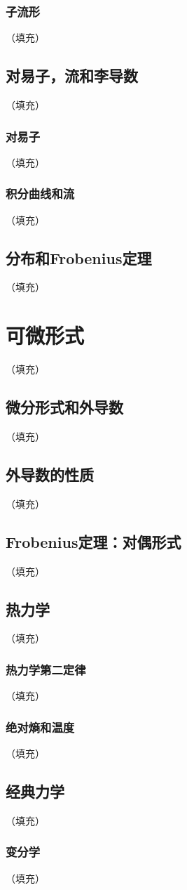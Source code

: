 \documentclass[hyperref,UTF8]{ctexbook}
\begin{document}
\subsection{子流形}（填充）
\section{对易子，流和李导数}（填充）
\subsection{对易子}（填充）
\subsection{积分曲线和流}（填充）
\section{分布和Frobenius定理}（填充）
\chapter{可微形式}（填充）
\section{微分形式和外导数}（填充）
\section{外导数的性质}（填充）
\section{Frobenius定理：对偶形式}（填充）
\section{热力学}（填充）
\subsection{热力学第二定律}（填充）
\subsection{绝对熵和温度}（填充）
\section{经典力学}（填充）
\subsection{变分学}（填充）
\end{document}
